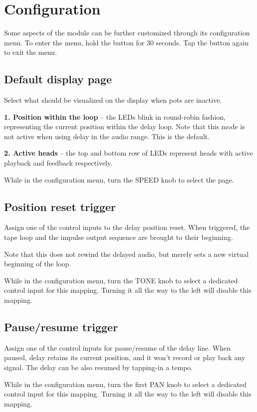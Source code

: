 \documentclass[11pt]{article}
\begin{document}
\noindent\begin{minipage}[t]{0.45\textwidth}\setlength{\parskip}{6pt}

\section{Configuration}

Some aspects of the module can be further customized through its configuration
menu. To enter the menu, hold the button for 30 seconds. Tap the button again
to exit the menu.

\subsection{Default display page}

Select what should be visualized on the display when pots are inactive.

\textbf{1. Position within the loop} -- the LEDs blink in round-robin fashion,
  representing the current position within the delay loop. Note that this mode
  is not active when using delay in the audio range. This is the default.

\textbf{2. Active heads} -- the top and bottom row of LEDs represent heads with
  active playback and feedback respectively.

While in the configuration menu, turn the SPEED knob to select the page.

\subsection{Position reset trigger} \label{section:configure-reset}

Assign one of the control inputs to the delay position reset. When triggered,
the tape loop and the impulse output sequence are brought to their beginning.

Note that this does not rewind the delayed audio, but merely sets a new virtual
beginning of the loop.

While in the configuration menu, turn the TONE knob to select a dedicated
control input for this mapping. Turning it all the way to the left will disable
this mapping.

\subsection{Pause/resume trigger} \label{section:configure-pause}

Assign one of the control inputs for pause/resume of the delay line. When
paused, delay retains its current position, and it won't record or play back any
signal. The delay can be also resumed by tapping-in a tempo.

While in the configuration menu, turn the first PAN knob to select a dedicated
control input for this mapping. Turning it all the way to the left will disable
this mapping.

\end{minipage}%
\end{document}
